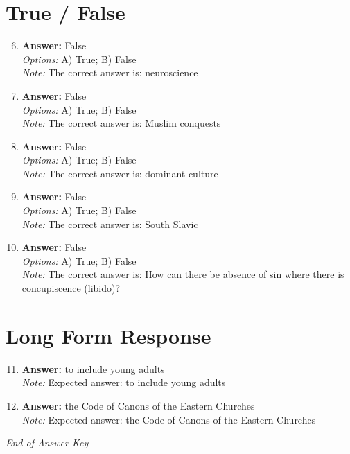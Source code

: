 \documentclass[12pt]{article}
\begin{document}
\section*{True / False}
\begin{enumerate}[label=\arabic*.]
\setcounter{enumi}{5}
\item \textbf{Answer:} False
\\ \textit{Options:} A) True; B) False
\\ \textit{Note:} The correct answer is: neuroscience
\item \textbf{Answer:} False
\\ \textit{Options:} A) True; B) False
\\ \textit{Note:} The correct answer is: Muslim conquests
\item \textbf{Answer:} False
\\ \textit{Options:} A) True; B) False
\\ \textit{Note:} The correct answer is: dominant culture
\item \textbf{Answer:} False
\\ \textit{Options:} A) True; B) False
\\ \textit{Note:} The correct answer is: South Slavic
\item \textbf{Answer:} False
\\ \textit{Options:} A) True; B) False
\\ \textit{Note:} The correct answer is: How can there be absence of sin where there is concupiscence (libido)?
\end{enumerate}

\section*{Long Form Response}
\begin{enumerate}[label=\arabic*.]
\setcounter{enumi}{10}
\item \textbf{Answer:} to include young adults
\\ \textit{Note:} Expected answer: to include young adults
\item \textbf{Answer:} the Code of Canons of the Eastern Churches
\\ \textit{Note:} Expected answer: the Code of Canons of the Eastern Churches
\end{enumerate}

\vfill
\noindent\textit{End of Answer Key}
\end{document}
